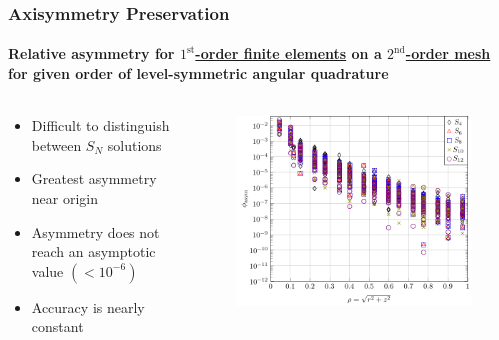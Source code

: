 \documentclass[compress,t]{beamer}
\begin{document}
\begin{frame}[t]
\frametitle{Axisymmetry Preservation}
\framesubtitle{Relative asymmetry for \underline{$1^\text{st}$-order finite elements} on a \underline{$2^\text{nd}$-order mesh} for given order of level-symmetric angular quadrature}

\begin{columns}[T]

\begin{column}{0.4\textwidth}
\begin{itemize}
\item{Difficult to distinguish between $S_N$ solutions}
\item{Greatest asymmetry near origin}
\item{Asymmetry does not reach an asymptotic value $(<10^{-6})$}
\item{Accuracy is nearly constant}
\end{itemize}

\end{column}

\begin{column}{0.6\textwidth}
\begin{figure}
\flushright
\includegraphics[scale=0.6]{./graphics/RZASMMSLinearRhoBrunnerp1g2r2.pdf}
\end{figure}

\end{column}

\end{columns}

\end{frame}
\end{document}
